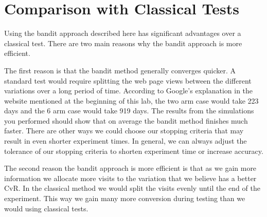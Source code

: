 \section*{Comparison with Classical Tests}
Using the bandit approach described here has significant advantages over a classical test.  There are two main reasons why the bandit approach is more efficient.  

The first reason is that the bandit method generally converges quicker.  A standard test would require splitting the web page views between the different variations over a long period of time.  According to Google's explanation in the website mentioned at the beginning of this lab, the two arm case would take 223 days and the 6 arm case would take 919 days.  The results from the simulations you performed should show that on average the bandit method finishes much faster.  There are other ways we could choose our stopping criteria that may result in even shorter experiment times.  In general, we can always adjust the tolerance of our stopping criteria to shorten experiment time or increase accuracy.

The second reason the bandit approach is more efficient is that as we gain more information we allocate more visits to the variation that we believe has a better CvR.  In the classical method we would split the visits evenly until the end of the experiment.  This way we gain many more conversion during testing than we would using classical tests.


